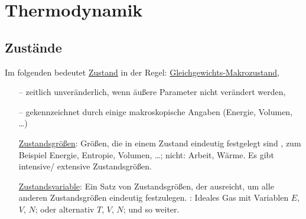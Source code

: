 \section{Thermodynamik}
\subsection{Zustände}
Im folgenden bedeutet \uline{Zustand} in der Regel: \uline{Gleichgewichts-Makrozustand},
\begin{itemize}[align=left,labelwidth=\widthof{--},labelsep=1ex,labelindent=0pt,leftmargin=++]
  \item[--] zeitlich unveränderlich, wenn äußere Parameter nicht verändert werden,
  \item[--] gekennzeichnet durch einige makroskopische Angaben (Energie, Volumen, \dots)
\end{itemize}

\begin{itemize}[align=left,labelwidth=,labelsep=1ex,labelindent=0pt,leftmargin=++]
  \item[\uline{Zustandsgrößen}:] Größen, die in einem Zustand eindeutig festgelegt sind , zum Beispiel Energie, Entropie, Volumen, \dots; nicht: Arbeit, Wärme. Es gibt intensive/ extensive Zustandsgrößen.
  \item[\uline{Zustandsvariable}:] Ein Satz von Zustandsgrößen, der ausreicht, um alle anderen Zustandsgrößen eindeutig festzulegen. : Ideales Gas mit Variablen $E$, $V$, $N$; oder alternativ $T$, $V$, $N$; und so weiter.
\end{itemize}

